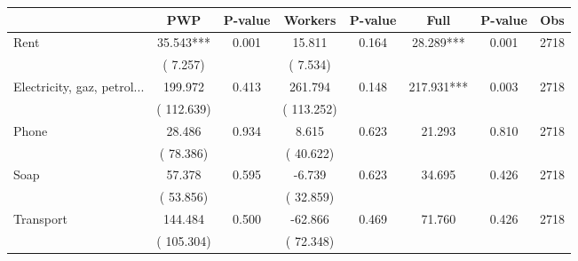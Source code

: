 
\begin{tabular}{l*{7}{c}}\hline&\multicolumn{1}{c}{PWP}&\multicolumn{1}{c}{P-value}&\multicolumn{1}{c}{Workers}&\multicolumn{1}{c}{P-value}&\multicolumn{1}{c}{Full}&\multicolumn{1}{c}{P-value}&\multicolumn{1}{c}{Obs} \\ \hline

 Rent       &             35.543***       &        0.001  &             15.811       &        0.164  &             28.289***       &              0.001 &  2718 \\ 
                       &       (       7.257)             &                               &       (       7.534)                     &                               &                                               &                                &                      \\ 

 Electricity, gaz, petrol...       &            199.972       &        0.413  &            261.794       &        0.148  &            217.931***       &              0.003 &  2718 \\ 
                       &       (     112.639)             &                               &       (     113.252)                     &                               &                                               &                                &                      \\ 

 Phone       &             28.486       &        0.934  &              8.615       &        0.623  &             21.293       &              0.810 &  2718 \\ 
                       &       (      78.386)             &                               &       (      40.622)                     &                               &                                               &                                &                      \\ 

 Soap       &             57.378       &        0.595  &             -6.739       &        0.623  &             34.695       &              0.426 &  2718 \\ 
                       &       (      53.856)             &                               &       (      32.859)                     &                               &                                               &                                &                      \\ 

 Transport       &            144.484       &        0.500  &            -62.866       &        0.469  &             71.760       &              0.426 &  2718 \\ 
                       &       (     105.304)             &                               &       (      72.348)                     &                               &                                               &                                &                      \\ 


\end{tabular}
